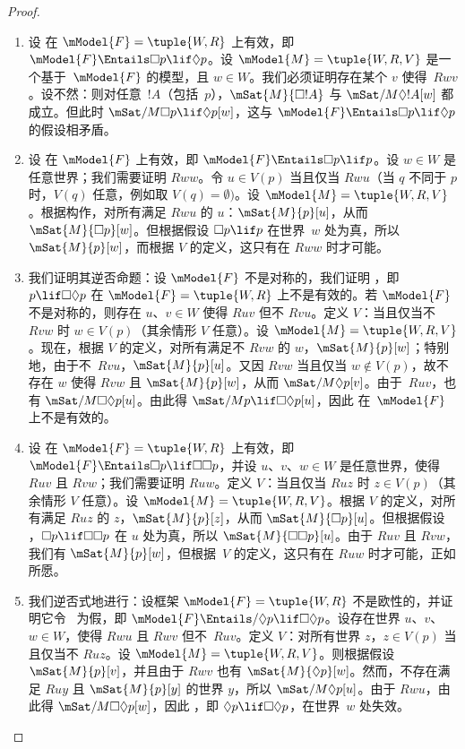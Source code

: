 \documentclass[../../../include/open-logic-section]{subfiles}
\begin{document}
\begin{proof}
  \begin{enumerate}
  \item 设  在 $\mModel{F} = \tuple{W, R}$ 上有效，即 $\mModel{F} \Entails \Box p \lif \Diamond p$。设 $\mModel{M} = \tuple{W, R, V}$ 是一个基于~$\mModel{F}$ 的模型，且 $w \in W$。我们必须证明存在某个 $v$ 使得~$Rwv$。设不然：则对任意~$!A$（包括~$p$），$\mSat{M}{\Box !A}$ 与 $\mSat/{M}{\Diamond !A}[w]$ 都成立。但此时 $\mSat/{M}{\Box p \lif \Diamond p}[w]$，这与 $\mModel{F} \Entails \Box p \lif \Diamond p$ 的假设相矛盾。
  \item 设  在 $\mModel{F}$ 上有效，即 $\mModel{F} \Entails \Box p \lif p$。设 $w \in W$ 是任意世界；我们需要证明 $Rww$。令 $u \in V(p)$ 当且仅当 $Rwu$（当 $q$ 不同于 $p$ 时，$V(q)$ 任意，例如取 $V(q) = \emptyset)$。设 $\mModel{M} = \tuple{W, R, V}$。根据构作，对所有满足 $Rwu$ 的 $u$：$\mSat{M}{p}[u]$，从而 $\mSat{M}{\Box p}[w]$。但根据假设 $\Box p \lif p$ 在世界~$w$ 处为真，所以 $\mSat{M}{p}[w]$，而根据 $V$ 的定义，这只有在 $Rww$ 时才可能。
  \item 我们证明其逆否命题：设 $\mModel{F}$ 不是对称的，我们证明 ，即 $p \lif \Box\Diamond p$ 在 $\mModel{F}= \tuple{W, R}$ 上不是有效的。若 $\mModel{F}$ 不是对称的，则存在 $u$、$v \in W$ 使得 $Ruv$ 但不 $Rvu$。定义 $V$：当且仅当不 $Rvw$ 时 $w \in V(p)$（其余情形 $V$ 任意）。设 $\mModel{M} =\tuple{W, R, V}$。现在，根据 $V$ 的定义，对所有满足不 $Rvw$ 的 $w$，$\mSat{M}{p}[w]$；特别地，由于不~$Rvu$，$\mSat{M}{p}[u]$。又因 $Rvw$ 当且仅当 $w \notin V(p)$，故不存在 $w$ 使得 $Rvw$ 且 $\mSat{M}{p}[w]$，从而 $\mSat/{M}{\Diamond p}[v]$。由于~$Ruv$，也有 $\mSat/{M}{\Box\Diamond p}[u]$。由此得 $\mSat/{M}{p \lif \Box\Diamond p}[u]$，因此  在~$\mModel{F}$ 上不是有效的。
  \item 设  在 $\mModel{F} = \tuple{W,R}$ 上有效，即 $\mModel{F} \Entails \Box p \lif \Box\Box p$，并设 $u$、$v$、$w \in W$ 是任意世界，使得 $Ruv$ 且 $Rvw$；我们需要证明 $Ruw$。定义 $V$：当且仅当 $Ruz$ 时 $z \in V(p)$（其余情形 $V$ 任意）。设 $\mModel{M} =\tuple{W, R, V}$。根据 $V$ 的定义，对所有满足 $Ruz$ 的 $z$，$\mSat{M}{p}[z]$，从而 $\mSat{M}{\Box p}[u]$。但根据假设 ，$\Box p \lif \Box \Box p$ 在 $u$ 处为真，所以 $\mSat{M}{\Box \Box p}[u]$。由于 $Ruv$ 且 $Rvw$，我们有 $\mSat{M}{p}[w]$，但根据~$V$ 的定义，这只有在 $Ruw$ 时才可能，正如所愿。
  \item 我们逆否式地进行：设框架 $\mModel{F} = \tuple{W, R}$ 不是欧性的，并证明它令~ 为假，即 $\mModel{F} \Entails/ \Diamond p \lif \Box\Diamond p$。设存在世界 $u$、$v$、$w \in W$，使得 $Rwu$ 且 $Rwv$ 但不~$Ruv$。定义 $V$：对所有世界 $z$，$z \in V(p)$ 当且仅当不 $Ruz$。设 $\mModel{M} =\tuple{W, R, V}$。则根据假设 $\mSat{M}{p}[v]$，并且由于 $Rwv$ 也有 $\mSat{M}{\Diamond p}[w]$。然而，不存在满足 $Ruy$ 且 $\mSat{M}{p}[y]$ 的世界 $y$，所以 $\mSat/{M}{\Diamond p}[u]$。由于 $Rwu$，由此得 $\mSat/{M}{\Box\Diamond p}[w]$，因此 ，即 $\Diamond p \lif \Box\Diamond p$，在世界~$w$ 处失效。
  \end{enumerate}
\end{proof}
\end{document}
